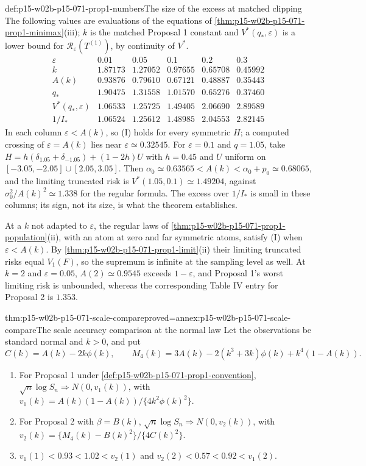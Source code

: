 \begin{hbexample}{def:p15-w02b-p15-071-prop1-numbers}{The size of the excess at matched clipping}
The following values are evaluations of the equations of
\cref{thm:p15-w02b-p15-071-prop1-minimax}(iii); \(k\) is the matched
Proposal 1 constant and \(V^*(q_*,\varepsilon)\) is a lower bound for
\(\mathcal R_\varepsilon(T^{(1)})\), by continuity of \(V^*\).
\[
\begin{array}{c|rrrrr}
\varepsilon&0.01&0.05&0.1&0.2&0.3\\\hline
k&1.87173&1.27052&0.97655&0.65708&0.45992\\
A(k)&0.93876&0.79610&0.67121&0.48887&0.35443\\
q_*&1.90475&1.31558&1.01570&0.65276&0.37460\\
V^*(q_*,\varepsilon)&1.06533&1.25725&1.49405&2.06690&2.89589\\
1/I_*&1.06524&1.25612&1.48985&2.04553&2.82145
\end{array}
\]
In each column \(\varepsilon<A(k)\), so (I) holds for every symmetric
\(H\); a computed crossing of \(\varepsilon=A(k)\) lies near
\(\varepsilon\simeq0.32545\). For \(\varepsilon=0.1\) and \(q=1.05\),
take \(H=h(\delta_{1.05}+\delta_{-1.05})+(1-2h)U\) with \(h=0.45\) and
\(U\) uniform on \([-3.05,-2.05]\cup[2.05,3.05]\). Then
\(\alpha_0\simeq0.63565<A(k)<\alpha_0+p_0\simeq0.68065\), and the
limiting truncated risk is \(V^*(1.05,0.1)\simeq1.49204\), against
\(\sigma_0^2/A(k)^2\simeq1.338\) for the regular formula. The excess
over \(1/I_*\) is small in these columns; its sign, not its size, is
what the theorem establishes.

At a \(k\) not adapted to \(\varepsilon\), the regular laws of
\cref{thm:p15-w02b-p15-071-prop1-population}(ii), with an atom at zero
and far symmetric atoms, satisfy (I) when \(\varepsilon<A(k)\). By
\cref{thm:p15-w02b-p15-071-prop1-limit}(ii) their limiting truncated
risks equal \(V_1(F)\), so the supremum is infinite at the sampling
level as well. At \(k=2\) and \(\varepsilon=0.05\), \(A(2)\simeq0.9545\)
exceeds \(1-\varepsilon\), and Proposal 1's worst limiting risk is
unbounded, whereas the corresponding Table IV entry for Proposal 2 is
\(1.353\).
\end{hbexample}

\begin{hbtheorem}{thm:p15-w02b-p15-071-scale-compare}{proved=annex:p15-w02b-p15-071-scale-compare}{The scale accuracy comparison at the normal law}
Let the observations be standard normal and \(k>0\), and put
\[
 C(k)=A(k)-2k\phi(k),\qquad
 M_4(k)=3A(k)-2(k^3+3k)\phi(k)+k^4(1-A(k)).
\]
\begin{enumerate}
\item For Proposal 1 under \cref{def:p15-w02b-p15-071-prop1-convention},
 \(\sqrt n\log S_n\Rightarrow N(0,v_1(k))\), with
 \(v_1(k)=A(k)(1-A(k))/\{4k^2\phi(k)^2\}\).
\item For Proposal 2 with \(\beta=B(k)\),
 \(\sqrt n\log S_n\Rightarrow N(0,v_2(k))\), with
 \(v_2(k)=\{M_4(k)-B(k)^2\}/\{4C(k)^2\}\).
\item \(v_1(1)<0.93<1.02<v_2(1)\) and \(v_2(2)<0.57<0.92<v_1(2)\).
\end{enumerate}
\end{hbtheorem}

